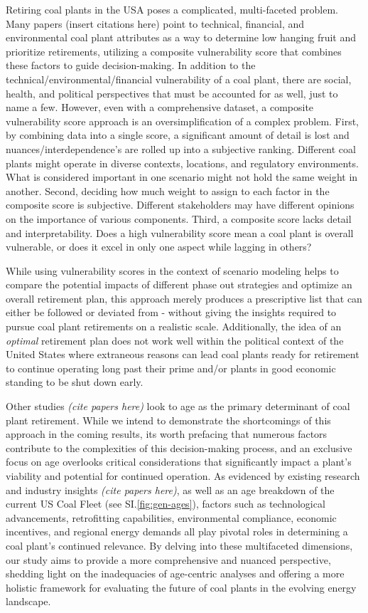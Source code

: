 Retiring coal plants in the USA poses a complicated, multi-faceted problem. Many papers (insert citations here) point to technical, financial, and environmental 
coal plant attributes as a way to determine low hanging fruit and prioritize retirements, utilizing a composite vulnerability score that combines these factors to guide 
decision-making. In addition to the technical/environmental/financial vulnerability of a coal plant, there are social, health, and political perspectives that must be accounted for as well, just 
to name a few. However, even with a comprehensive dataset, a composite vulnerability score approach is an oversimplification of a complex problem. 
First, by combining data into a single score, a significant amount of detail is lost and nuances/interdependence's are rolled up into a subjective 
ranking. Different coal plants might operate in diverse contexts, locations, and regulatory environments. What is considered important in 
one scenario might not hold the same weight in another. Second, deciding how much weight to assign to each factor in the composite score is subjective. Different stakeholders may have 
different opinions on the importance of various components. Third, a composite score lacks detail and interpretability. Does a high vulnerability score mean a coal plant is 
overall vulnerable, or does it excel in only one aspect while lagging in others?

While using vulnerability scores in the context of scenario modeling helps to compare the potential impacts of different phase out strategies and 
optimize an overall retirement plan, this approach merely produces a prescriptive list that can either be followed or deviated from - without giving 
the insights required to pursue coal plant retirements on a realistic scale. Additionally, the idea of an \textit{optimal} retirement plan does not work well 
within the political context of the United States where extraneous reasons can lead coal plants ready for retirement to continue operating long 
past their prime and/or plants in good economic standing to be shut down early.

Other studies \textit{(cite papers here)} look to age as the primary determinant of coal plant retirement. While we intend to demonstrate the shortcomings of this approach 
in the coming results, its worth prefacing that numerous factors contribute to the complexities of this decision-making process, and an exclusive focus on age overlooks 
critical considerations that significantly impact a plant's viability and potential for continued operation. As evidenced by existing research and industry insights \textit{(cite papers here)},
as well as an age breakdown of the current US Coal Fleet (see SI.\ref{fig:gen-ages}),
factors such as technological advancements, retrofitting capabilities, environmental compliance, economic incentives, and regional energy demands all play pivotal roles 
in determining a coal plant's continued relevance. By delving into these multifaceted dimensions, our study aims to provide a more comprehensive and nuanced perspective, 
shedding light on the inadequacies of age-centric analyses and offering a more holistic framework for evaluating the future of coal plants in the evolving energy landscape.



